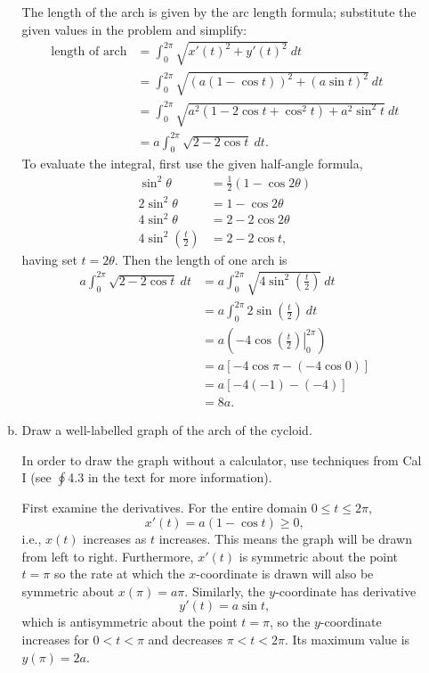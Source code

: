 \documentclass[12pt]{article}
\begin{document}
\begin{enumerate}[1.]
\begin{enumerate}[(a)]
\vspace{1pc}
 The length of the arch is given by the arc length formula; substitute the given values in the problem and simplify:
\[\begin{split}
\text{length of arch} &= \int_{0}^{2\pi}\sqrt{x'(t)^2+y'(t)^2}\ dt \\
	&= \int_{0}^{2\pi}\sqrt{\left(a(1-\cos{t})\right)^2+(a\sin{t})^2}\ dt \\
	&= \int_{0}^{2\pi}\sqrt{a^2\left(1-2\cos{t}+\cos^2{t}\right)+a^2\sin^2{t}}\ dt \\
	&= a\int_{0}^{2\pi}\sqrt{2-2\cos{t}}\ dt.
\end{split}\]
To evaluate the integral, first use the given half-angle formula,
\[\begin{split}
\sin^2{\theta} &= \textstyle\frac{1}{2}\left(1-\cos{2\theta}\right) \\
2\sin^2{\theta} &= 1-\cos{2\theta} \\
4\sin^2{\theta} &= 2-2\cos{2\theta} \\
4\sin^2{\left(\textstyle\frac{t}{2}\right)} &= 2-2\cos{t}, 
\end{split}\] 
having set $t=2\theta$.  Then the length of one arch is
\[\begin{split}
a\int_{0}^{2\pi}\sqrt{2-2\cos{t}}\ dt &= a\int_{0}^{2\pi}\sqrt{4\sin^2{(\textstyle\frac{t}{2})}}\ dt \\
	&= a\int_{0}^{2\pi}2\sin{\left(\textstyle\frac{t}{2}\right)}\ dt \\
	&= a\left(\left.-4\cos{\left(\textstyle\frac{t}{2}\right)}\right\vert_{0}^{2\pi}\right) \\
	&= a\left[-4\cos{\pi}-(-4\cos{0})\right] \\
	&= a\left[-4(-1)-(-4)\right] \\
	&\boxed{= 8a.}
\end{split}\]
\vspace{2pc}
\item Draw a well-labelled graph of the arch of the cycloid.

\vspace{1pc}
 In order to draw the graph without a calculator, use techniques from Cal I (see $\textstyle\oint$4.3 in the text for more information).

\vspace{1pc}
First examine the derivatives.  For the entire domain $0\leq t\leq 2\pi$, 
\[
x'(t)=a(1-\cos{t})\geq 0,
\]
i.e., $x(t)$ increases as $t$ increases.  This means the graph will be drawn from left to right.  Furthermore, $x'(t)$ is symmetric about the point $t=\pi$ so the rate at which the $x$-coordinate is drawn will also be symmetric about $x(\pi)=a\pi$.  Similarly, the $y$-coordinate has derivative
\[
y'(t)=a\sin{t},
\]
which is antisymmetric about the point $t=\pi$, so the $y$-coordinate increases for $0< t< \pi$ and decreases $\pi < t < 2\pi$.  Its maximum value is $y(\pi)=2a$.


\end{enumerate}
\end{enumerate}
\end{document}
